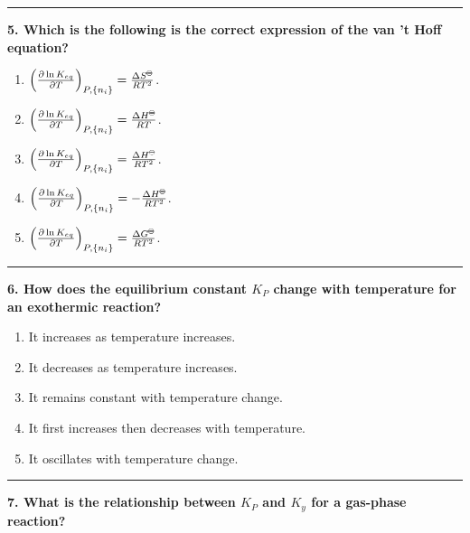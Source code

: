 \documentclass[
  9pt,
]{extbook}
\providecommand{\tightlist}{%
  \setlength{\itemsep}{0pt}\setlength{\parskip}{0pt}}
\theoremstyle{definition}
\theoremstyle{definition}
\theoremstyle{definition}
\theoremstyle{remark}
\begin{document}
\begin{center}\rule{0.5\linewidth}{0.5pt}\end{center}

\textbf{5. Which is the following is the correct expression of the van 't Hoff equation?}

\begin{enumerate}
\def\labelenumi{\alph{enumi}.}
\tightlist
\item
  \(\left(\frac{\partial \ln K_{eq}}{\partial T}\right)_{P,\{n_i\}} = \frac{\Delta S^{{-\kern-6pt{\ominus}\kern-6pt-}}}{RT^2}\).
\item
  \(\left(\frac{\partial \ln K_{eq}}{\partial T}\right)_{P,\{n_i\}} = \frac{\Delta H^{{-\kern-6pt{\ominus}\kern-6pt-}}}{RT}\).
\item
  \(\left(\frac{\partial \ln K_{eq}}{\partial T}\right)_{P,\{n_i\}} = \frac{\Delta H^{{-\kern-6pt{\ominus}\kern-6pt-}}}{RT^2}\).
\item
  \(\left(\frac{\partial \ln K_{eq}}{\partial T}\right)_{P,\{n_i\}} = -\frac{\Delta H^{{-\kern-6pt{\ominus}\kern-6pt-}}}{RT^2}\).
\item
  \(\left(\frac{\partial \ln K_{eq}}{\partial T}\right)_{P,\{n_i\}} = \frac{\Delta G^{{-\kern-6pt{\ominus}\kern-6pt-}}}{RT^2}\).
\end{enumerate}

\begin{center}\rule{0.5\linewidth}{0.5pt}\end{center}

\textbf{6. How does the equilibrium constant \(K_P\) change with temperature for an exothermic reaction?}

\begin{enumerate}
\def\labelenumi{\alph{enumi}.}
\tightlist
\item
  It increases as temperature increases.
\item
  It decreases as temperature increases.
\item
  It remains constant with temperature change.
\item
  It first increases then decreases with temperature.
\item
  It oscillates with temperature change.
\end{enumerate}

\begin{center}\rule{0.5\linewidth}{0.5pt}\end{center}

\textbf{7. What is the relationship between \(K_P\) and \(K_y\) for a gas-phase reaction?}
\end{document}
